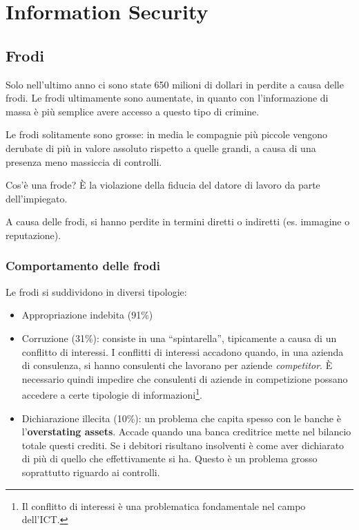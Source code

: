 \part{Information Security}

\chapter{Frodi}
\label{Frodi}

Solo nell'ultimo anno ci sono state 650 milioni di dollari in perdite a causa delle 
frodi. Le frodi ultimamente sono aumentate, in quanto con l'informazione di massa 
è più semplice avere accesso a questo tipo di crimine.

Le frodi solitamente sono grosse: in media le compagnie più piccole vengono
derubate di più in valore assoluto rispetto a quelle grandi, a causa di una 
presenza meno massiccia di controlli.

Cos'è una frode? È la violazione della fiducia del datore di lavoro da parte 
dell'impiegato.

A causa delle frodi, si hanno perdite in termini diretti o 
indiretti (es. immagine o reputazione).

\section{Comportamento delle frodi}

Le frodi si suddividono in diversi tipologie:

\begin{itemize}
  \item Appropriazione indebita (91\%)
  \item Corruzione (31\%): consiste in una ``spintarella'', tipicamente a causa di un conflitto di 
  interessi. I conflitti di interessi accadono quando, in una azienda di 
  consulenza, si hanno consulenti che lavorano per aziende \textit{competitor}.
  È necessario quindi impedire che consulenti di aziende in competizione possano 
  accedere a   certe tipologie di informazioni\footnote{Il conflitto di interessi è una
  problematica fondamentale nel campo dell'ICT.}.
  \item Dichiarazione illecita (10\%): un problema che capita spesso con le banche è l'\textbf{overstating assets}.
  Accade quando una banca creditrice mette nel bilancio totale questi crediti.
  Se i debitori risultano insolventi è come aver dichiarato di più di quello
  che effettivamente si ha. Questo è un problema grosso soprattutto riguardo ai
  controlli.
\end{itemize}
